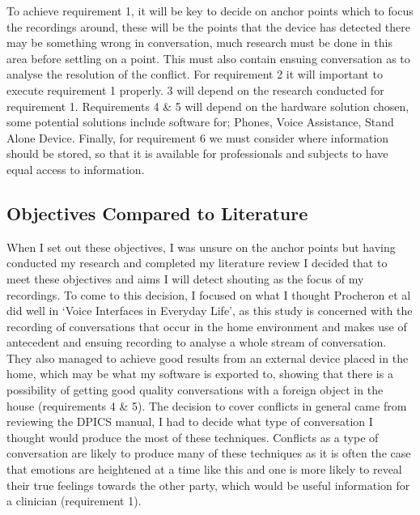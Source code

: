 \documentclass[a4paper,11pt]{report}
\begin{document}
To achieve requirement 1, it will be key to decide on anchor points which to focus the recordings around, these will be the points that the device has detected there may be something wrong in conversation, much research must be done in this area before settling on a point. This must also contain ensuing conversation as to analyse the resolution of the conflict. For requirement 2 it will important to execute requirement 1 properly. 3 will depend on the research conducted for requirement 1. Requirements 4 \& 5 will depend on the hardware solution chosen, some potential solutions include software for; Phones, Voice Assistance, Stand Alone Device. Finally, for requirement 6 we must consider where information should be stored, so that it is available for professionals and subjects to have equal access to information.\\

\subsection{Objectives Compared to Literature}
When I set out these objectives, I was unsure on the anchor points but having conducted my research and completed my literature review I decided that to meet these objectives and aims I will detect shouting as the focus of my recordings. To come to this decision, I focused on what I thought Procheron et al did well in ‘Voice Interfaces in Everyday Life’, as this study is concerned with the recording of conversations that occur in the home environment and makes use of antecedent and ensuing recording to analyse a whole stream of conversation. They also managed to achieve good results from an external device placed in the home, which may be what my software is exported to, showing that there is a possibility of getting good quality conversations with a foreign object in the house (requirements 4 \& 5). The decision to cover conflicts in general came from reviewing the DPICS manual, I had to decide what type of conversation I thought would produce the most of these techniques. Conflicts as a type of conversation are likely to produce many of these techniques as it is often the case that emotions are heightened at a time like this and one is more likely to reveal their true feelings towards the other party, which would be useful information for a clinician (requirement 1). \\
 
\end{document}
